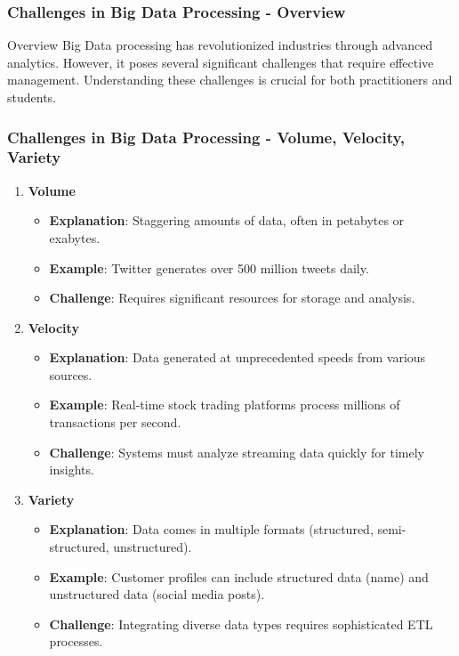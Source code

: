 \documentclass[aspectratio=169]{beamer}
\begin{document}
\begin{frame}[fragile]
    \frametitle{Challenges in Big Data Processing - Overview}
    \begin{block}{Overview}
        Big Data processing has revolutionized industries through advanced analytics. However, it poses several significant challenges that require effective management. Understanding these challenges is crucial for both practitioners and students.
    \end{block}
\end{frame}

\begin{frame}[fragile]
    \frametitle{Challenges in Big Data Processing - Volume, Velocity, Variety}
    \begin{enumerate}
        \item \textbf{Volume}
            \begin{itemize}
                \item \textbf{Explanation}: Staggering amounts of data, often in petabytes or exabytes.
                \item \textbf{Example}: Twitter generates over 500 million tweets daily.
                \item \textbf{Challenge}: Requires significant resources for storage and analysis.
            \end{itemize}

        \item \textbf{Velocity}
            \begin{itemize}
                \item \textbf{Explanation}: Data generated at unprecedented speeds from various sources.
                \item \textbf{Example}: Real-time stock trading platforms process millions of transactions per second.
                \item \textbf{Challenge}: Systems must analyze streaming data quickly for timely insights.
            \end{itemize}

        \item \textbf{Variety}
            \begin{itemize}
                \item \textbf{Explanation}: Data comes in multiple formats (structured, semi-structured, unstructured).
                \item \textbf{Example}: Customer profiles can include structured data (name) and unstructured data (social media posts).
                \item \textbf{Challenge}: Integrating diverse data types requires sophisticated ETL processes.
            \end{itemize}
    \end{enumerate}
\end{frame}
\end{document}
